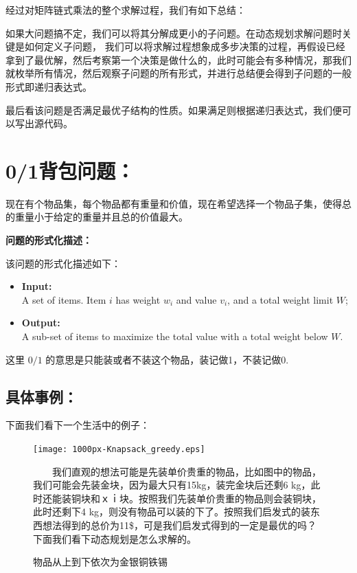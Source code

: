 经过对矩阵链式乘法的整个求解过程，我们有如下总结：

如果大问题搞不定，我们可以将其分解成更小的子问题。在动态规划求解问题时关键是如何定义子问题，
我们可以将求解过程想象成多步决策的过程，再假设已经拿到了最优解，然后考察第一个决策是做什么的，此时可能会有多种情况，那我们就枚举所有情况，然后观察子问题的所有形式，并进行总结便会得到子问题的一般形式即递归表达式。

最后看该问题是否满足最优子结构的性质。如果满足则根据递归表达式，我们便可以写出源代码。


\section{0/1背包问题：}

现在有个物品集，每个物品都有重量和价值，现在希望选择一个物品子集，使得总的重量小于给定的重量并且总的价值最大。

\textbf{问题的形式化描述：}

该问题的形式化描述如下：

\begin{itemize}
    \item {\bf Input:}\\ A set of items. Item $i$ has weight $w_i$ and value $v_i$, and a total weight limit $W$;
	\item {\bf Output:}\\ A sub-set of items to maximize the total value with a total weight below $W$.
\end{itemize}

这里 $ 0/1$ 的意思是只能装或者不装这个物品，装记做1，不装记做0.

\indent
\subsection{具体事例：}

下面我们看下一个生活中的例子：
\begin{figure}[htbp]
\centering
\texttt{[image: 1000px-Knapsack\_greedy.eps]}
\caption{物品从上到下依次为金银铜铁锡}

\begin{flushleft}
~~~~我们直观的想法可能是先装单价贵重的物品，比如图中的物品，我们可能会先装金块，因为最大只有15kg，装完金块后还剩6 kg，此时还能装铜块和ｘｉ块。按照我们先装单价贵重的物品则会装铜块，此时还剩下4 kg，则没有物品可以装的下了。按照我们启发式的装东西想法得到的总价为11\$，可是我们启发式得到的一定是最优的吗？下面我们看下动态规划是怎么求解的。
\end{flushleft}

\end{figure}


